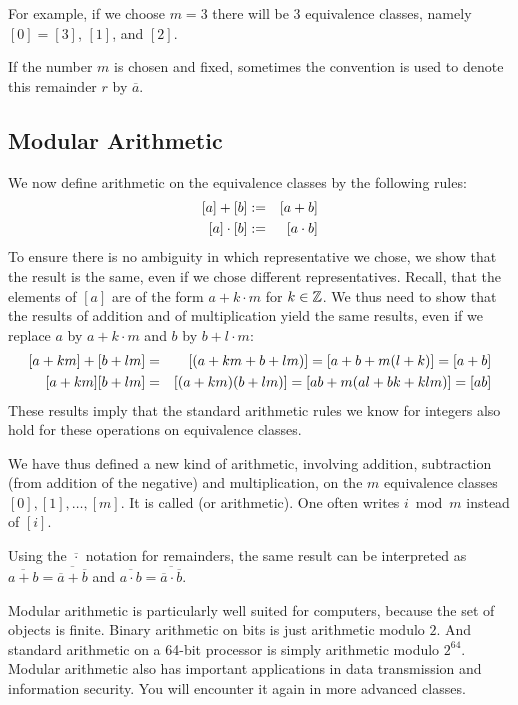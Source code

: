 For example, if we choose $m=3$ there will be $3$ equivalence classes,
namely $[0]=[3]$, $[1]$, and $[2]$.

If the number $m$ is chosen and fixed, sometimes the convention is used to
denote this remainder $r$ by $\overline a$.

\subsection{Modular Arithmetic}
\label{secmodular}

We now define arithmetic on the equivalence classes by the following rules:
\begin{eqnarray*}
\hbox{$[a]+[b]$}&:=&[a+b]\\
\hbox{$[a]\cdot[b]$}&:=&[a\cdot b]\\
\end{eqnarray*}
To ensure there is no ambiguity in which representative we chose, we show that the
result is the same, even if we chose different representatives. Recall, that the
elements of $[a]$ are of the form $a+k\cdot m$ for $k\in{\mathbb Z}$. We thus need to show that
the results of addition and of multiplication yield the same results, even if we replace
$a$ by $a+k\cdot m$ and $b$ by $b+l\cdot m$:
\begin{eqnarray*}
\hbox{$[a+km]+[b+lm]$}&=&[(a+km+b+lm)]=[a+b+m(l+k)]=[a+b]\\
\hbox{$[a+km][b+lm]$}&=&[(a+km)(b+lm)]=[ab+m(al+bk+klm)]=[ab]
\end{eqnarray*}
These results imply that the standard arithmetic rules
we know for integers also hold for these operations on equivalence classes.

We have thus defined a new kind of arithmetic, involving addition, subtraction (from
addition of the negative) and multiplication, on the $m$ equivalence classes
$[0],[1],\ldots,[m]$. It is called  (or 
arithmetic). One often writes
$i\bmod m$ instead of $[i]$.

Using the $\overline\cdot$ notation for remainders, the same result can be
interpreted as
$\overline{a+b}=\overline{\overline{a}+\overline{b}}$ and
$\overline{a\cdot b}=\overline{\overline{a}\cdot \overline{b}}$.
\medskip

Modular arithmetic is particularly well suited for computers, because the set
of objects is finite. Binary arithmetic on bits is just arithmetic modulo
$2$. And standard arithmetic on a 64-bit processor is simply arithmetic
modulo $2^{64}$.  Modular arithmetic also has important applications in data
transmission and information security. You will encounter it again in more
advanced classes.

